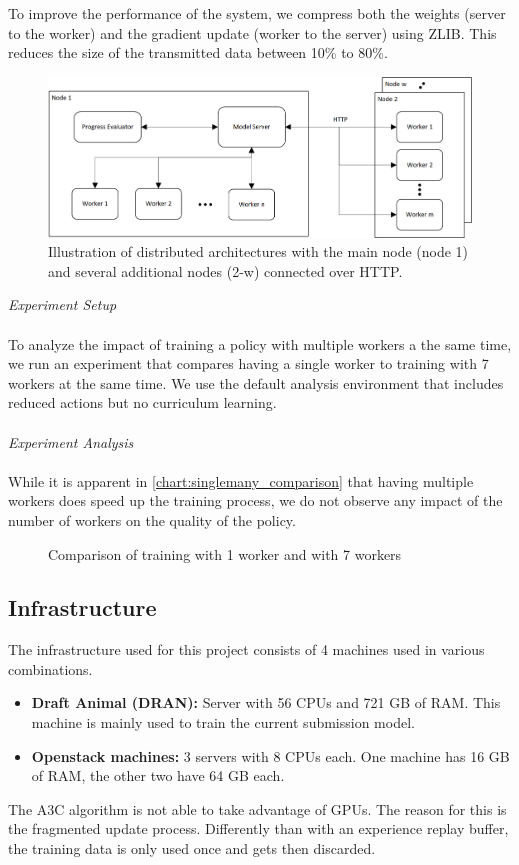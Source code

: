 To improve the performance of the system, we compress both the weights (server to the worker) and the gradient update (worker to the server) using ZLIB. This reduces the size of the transmitted data between 10\% to 80\%.
\begin{figure}[H]
	\centering
	\includegraphics[width=400pt]{images/visio/architecture.png}
	\caption{Illustration of distributed architectures with the main node (node 1) and several additional nodes (2-w) connected over HTTP.}
	\label{dist_architecture_img}
\end{figure}
\textit{Experiment Setup}\\\\
To analyze the impact of training a policy with multiple workers a the same time, we run an experiment that compares having a single worker to training with 7 workers at the same time. We use the default analysis environment that includes reduced actions but no curriculum learning.\\\\
\textit{Experiment Analysis}\\\\
While it is apparent in \autoref{chart:singlemany_comparison} that having multiple workers does speed up the training process, we do not observe any impact of the number of workers on the quality of the policy.
\begin{figure}[H]
	\begin{center}
		
	\end{center}
	\caption{Comparison of training with 1 worker and with 7 workers}
	\label{chart:singlemany_comparison}
\end{figure}
\subsection*{Infrastructure}\label{infrastructure}
The infrastructure used for this project consists of 4 machines used in various combinations.
\begin{itemize}
	\item \textbf{Draft Animal (DRAN):} Server with 56 CPUs and 721 GB of RAM. This machine is mainly used to train the current submission model.
	\item \textbf{Openstack machines:} 3 servers with 8 CPUs each. One machine has 16 GB of RAM, the other two have 64 GB each.
\end{itemize}
The A3C algorithm is not able to take advantage of GPUs. The reason for this is the fragmented update process. Differently than with an experience replay buffer, the training data is only used once and gets then discarded.
\newpage
